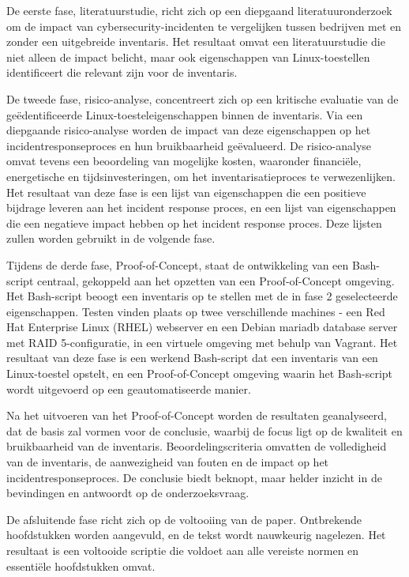 De eerste fase, literatuurstudie, richt zich op een diepgaand literatuuronderzoek om de impact van cybersecurity-incidenten te vergelijken tussen bedrijven met en zonder een uitgebreide inventaris. Het resultaat omvat een literatuurstudie die niet alleen de impact belicht, maar ook eigenschappen van Linux-toestellen identificeert die relevant zijn voor de inventaris.

De tweede fase, risico-analyse, concentreert zich op een kritische evaluatie van de ge\"edentificeerde Linux-toesteleigenschappen binnen de inventaris. Via een diepgaande risico-analyse worden de impact van deze eigenschappen op het incidentresponseproces en hun bruikbaarheid geëvalueerd. De risico-analyse omvat tevens een beoordeling van mogelijke kosten, waaronder financiële, energetische en tijdsinvesteringen, om het inventarisatieproces te verwezenlijken. Het resultaat van deze fase is een lijst van eigenschappen die een positieve bijdrage leveren aan het incident response proces, en een lijst van eigenschappen die een negatieve impact hebben op het incident response proces. Deze lijsten zullen worden gebruikt in de volgende fase.

Tijdens de derde fase, Proof-of-Concept, staat de ontwikkeling van een Bash-script centraal, gekoppeld aan het opzetten van een Proof-of-Concept omgeving. Het Bash-script beoogt een inventaris op te stellen met de in fase 2 geselecteerde eigenschappen. Testen vinden plaats op twee verschillende machines - een Red Hat Enterprise Linux (RHEL) webserver en een Debian mariadb database server met RAID 5-configuratie, in een virtuele omgeving met behulp van Vagrant. Het resultaat van deze fase is een werkend Bash-script dat een inventaris van een Linux-toestel opstelt, en een Proof-of-Concept omgeving waarin het Bash-script wordt uitgevoerd op een geautomatiseerde manier.

Na het uitvoeren van het Proof-of-Concept worden de resultaten geanalyseerd, dat de basis zal vormen voor de conclusie, waarbij de focus ligt op de kwaliteit en bruikbaarheid van de inventaris. Beoordelingscriteria omvatten de volledigheid van de inventaris, de aanwezigheid van fouten en de impact op het incidentresponseproces. De conclusie biedt beknopt, maar helder inzicht in de bevindingen en antwoordt op de onderzoeksvraag.

De afsluitende fase richt zich op de voltooiing van de paper. Ontbrekende hoofdstukken worden aangevuld, en de tekst wordt nauwkeurig nagelezen. Het resultaat is een voltooide scriptie die voldoet aan alle vereiste normen en essenti\"ele hoofdstukken omvat.

